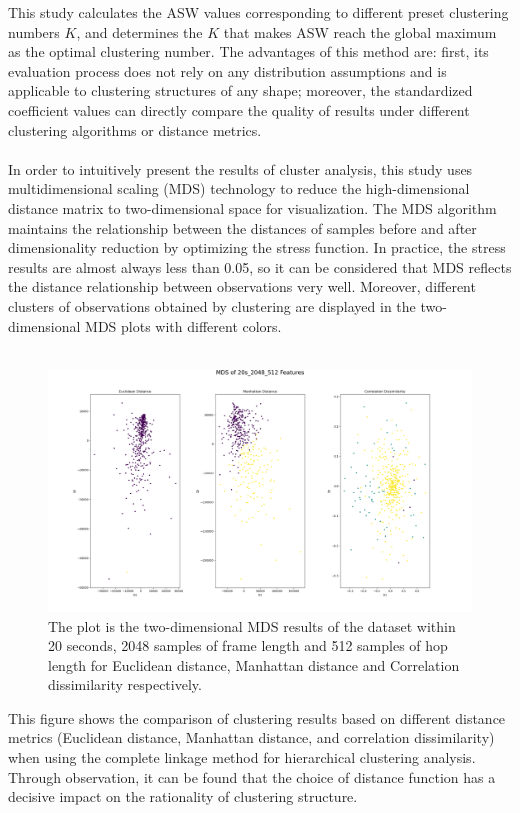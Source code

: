 This study calculates the ASW values corresponding to different preset clustering numbers $K$, and determines the $K$ that makes ASW reach the global maximum as the optimal clustering number. The advantages of this method are: first, its evaluation process does not rely on any distribution assumptions and is applicable to clustering structures of any shape; moreover, the standardized coefficient values can directly compare the quality of results under different clustering algorithms or distance metrics.\\
\\
In order to intuitively present the results of cluster analysis, this study uses multidimensional scaling (MDS) technology to reduce the high-dimensional distance matrix to two-dimensional space for visualization. The MDS algorithm maintains the relationship between the distances of samples before and after dimensionality reduction by optimizing the stress function. In practice, the stress results are almost always less than 0.05, so it can be considered that MDS reflects the distance relationship between observations very well. Moreover, different clusters of observations obtained by clustering are displayed in the two-dimensional MDS plots with different colors.\\
\\
\begin{figure}[H]
	\centering
	\includegraphics[width=0.9\linewidth]{../Statistical_Sciences_template/figure/MDS of 20s_2048_512 Features Using Complete Linkage.png}
	\caption{The plot is the two-dimensional MDS results of the dataset within 20 seconds, 2048 samples of frame length and 512 samples of hop length for Euclidean distance, Manhattan distance and Correlation dissimilarity respectively.}
	\label{fig:MDS of 20s_1024_256 Features Using Complete Linkage}
\end{figure}
\noindent This figure shows the comparison of clustering results based on different distance metrics (Euclidean distance, Manhattan distance, and correlation dissimilarity) when using the complete linkage method for hierarchical clustering analysis. Through observation, it can be found that the choice of distance function has a decisive impact on the rationality of clustering structure.\\

